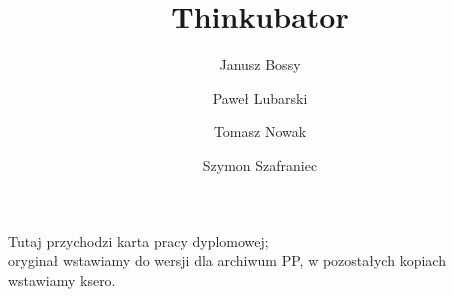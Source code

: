 \documentclass[polish,bachelor,a4paper,twoside,12pt]{../fcm-unofficial/ppfcmthesis}
\author{%
	Janusz Bossy \album{66222} \and 
	Paweł Lubarski \album{66276} \and
	Tomasz Nowak \album{66293} \and
	Szymon Szafraniec \album{67723}}
\title{Thinkubator}
\begin{document}
\frontmatter\pagestyle{empty}%
\maketitle\cleardoublepage%

\thispagestyle{empty}\vspace*{\fill}%
\begin{center}Tutaj przychodzi karta pracy dyplomowej;\\oryginał wstawiamy do wersji dla archiwum PP, w pozostałych kopiach wstawiamy ksero.\end{center}%
\vfill\cleardoublepage%

\pagestyle{ppfcmthesis}%
\tableofcontents* \cleardoublepage%

\mainmatter%







\cleardoublepage\appendix%

{\raggedright\sloppy\small}

\ppcolophon
\end{document}
